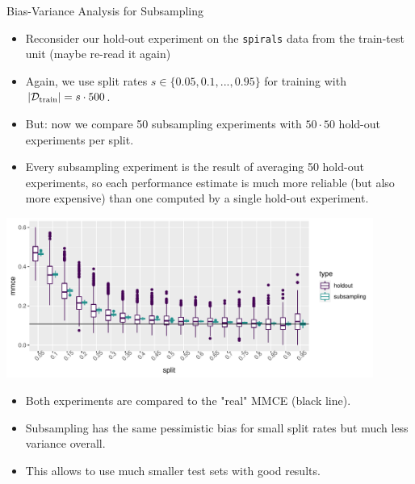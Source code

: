 \documentclass[11pt,compress,t,notes=noshow, xcolor=table]{beamer}
\begin{document}
\begin{vbframe}{Bias-Variance Analysis for Subsampling}

  \begin{itemize}
    \item Reconsider our hold-out experiment on the \texttt{spirals} data from 
    the train-test unit (maybe re-read it again)
    \item Again, we use split rates $s \in \{0.05, 0.1, ..., 0.95\}$ for 
    training with $|\mathcal{D}_{\text{train}}| = s \cdot 500$.
    \item But: now we compare 50 subsampling experiments with $50 \cdot 50$ 
    hold-out experiments per split.
    \item Every subsampling experiment is the result of averaging 50 hold-out 
    experiments, so each performance estimate is much more reliable (but also 
    more expensive) than one computed by a single hold-out experiment.
  \end{itemize}

\framebreak

\begin{center}
\includegraphics[width=0.9\textwidth]{figure/eval-resampling-example-1}
\end{center}



\begin{itemize}
  \item Both experiments are compared to the "real" MMCE (black line).
  \item Subsampling has the same pessimistic bias for small split rates but 
  much less variance overall.
  \item This allows to use much smaller test sets with good results.
\end{itemize}

\framebreak


\end{vbframe}
\end{document}
